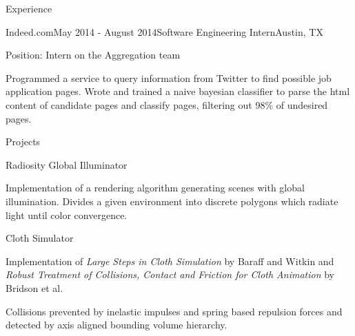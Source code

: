 \documentclass{resume} %
\begin{document}
\begin{rSection}{Experience}

\begin{rSubsection}{Indeed.com}{May 2014 - August 2014}{Software Engineering Intern}{Austin, TX}
\item Position: Intern on the Aggregation team
\item Programmed a service to query information from Twitter to find possible job application pages. Wrote and trained a naive bayesian classifier to parse the html content of candidate pages and classify pages, filtering out 98\% of undesired pages. 
\end{rSubsection}

\end{rSection}

\begin{rSection}{Projects}

  \begin{rSubsection}{Radiosity Global Illuminator}{}{}{}
  \item Implementation of a rendering algorithm generating scenes with global illumination. Divides a given environment into discrete polygons which radiate light until color convergence. 
  \end{rSubsection}

  \begin{rSubsection}{Cloth Simulator}{}{}{}
  \item Implementation of \textit{Large Steps in Cloth Simulation} by Baraff and Witkin and \textit{Robust Treatment of Collisions, Contact and Friction for Cloth Animation} by Bridson et al. 
  \item Collisions prevented by inelastic impulses and spring based repulsion forces and detected by axis aligned bounding volume hierarchy.
  \end{rSubsection}

\end{rSection}

\end{document}

